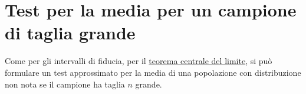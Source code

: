 \section{Test per la media per un campione di taglia grande}
Come per gli intervalli di fiducia, per il \hyperref[th: tlc]{teorema centrale del limite}, si può
formulare un test approssimato per la media di una popolazione con distribuzione non nota se il
campione ha taglia $n$ grande.